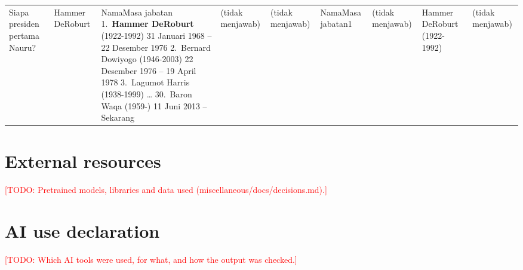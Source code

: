 \documentclass[11pt,a4paper]{article}
\newcommand{\todo}[1]{\textcolor{red}{[TODO: #1]}}
\begin{document}
\begin{landscape}
{\begin{longtable}{p{2.0cm}p{1.6cm}p{5.2cm}p{1.9cm}p{1.9cm}p{1.9cm}p{1.9cm}p{2.1cm}p{2.1cm}}
    Siapa presiden pertama Nauru? & Hammer DeRoburt
      & NamaMasa jabatan 1.\ \textbf{Hammer DeRoburt} (1922-1992) 31 Januari 1968 -- 22 Desember 1976 2.\ Bernard Dowiyogo (1946-2003) 22 Desember 1976 -- 19 April 1978 3.\ Lagumot Harris (1938-1999) \ldots{} 30.\ Baron Waqa (1959-) 11 Juni 2013 -- Sekarang
      & \cellcolor{enoans}(tidak menjawab) & \cellcolor{enoans}(tidak menjawab)
      & \cellcolor{ewsent}NamaMasa jabatan1 & \cellcolor{enoans}(tidak menjawab)
      & \cellcolor{elong}Hammer DeRoburt (1922-1992) & \cellcolor{enoans}(tidak menjawab) \\
\end{longtable}
}
\end{landscape}
\section{External resources}
\todo{Pretrained models, libraries and data used (miscellaneous/docs/decisions.md).}
\section{AI use declaration}
\todo{Which AI tools were used, for what, and how the output was checked.}



\end{document}
